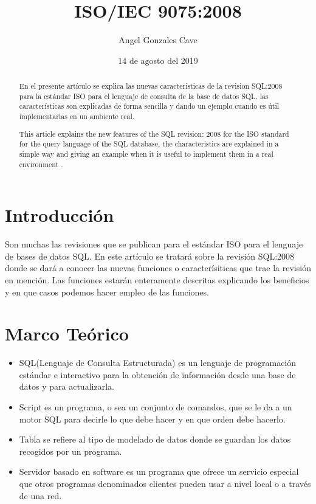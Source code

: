 \documentclass[twoside,twocolumn]{article}
\begin{document}
\title{ISO/IEC 9075:2008}
\author{Angel Gonzales Cave}
\date {14 de agosto del 2019}
\maketitle

\begin{abstract}
En el presente artículo se explica las nuevas caracteristicas de la revision SQL:2008 para la estándar ISO para el lenguaje de consulta de la base de datos SQL, las características son  explicadas de forma sencilla y dando un ejemplo cuando es útil implementarlas en un ambiente real.
\end{abstract}
\begin{abstract}
This article explains the new features of the SQL revision: 2008 for the ISO standard for the query language of the SQL database, the characteristics are explained in a simple way and giving an example when it is useful to implement them in a real environment .
\end{abstract}

\section{Introducción}
Son muchas las revisiones que se publican para el estándar ISO para el lenguaje de bases de datos SQL. En este artículo se tratará sobre la revisión SQL:2008 donde se dará a conocer las nuevas funciones o caracterísiticas que trae la revisión en mención. Las funciones estarán enteramente descritas explicando los beneficios y en que casos podemos hacer empleo de las funciones.
\section{Marco Teórico}
\begin{itemize}
\item SQL(Lenguaje de Consulta Estructurada) es un lenguaje de programación estándar e interactivo para la obtención de información desde una base de datos y para actualizarla.
\item Script es un programa, o sea un conjunto de comandos, que se le da a un motor SQL para decirle lo que debe hacer y en que orden debe hacerlo.
\item Tabla se refiere al tipo de modelado de datos donde se guardan los datos recogidos por un programa.
\item Servidor basado en software es un programa que ofrece un servicio especial que otros programas denominados clientes pueden usar a nivel local o a través de una red.
\end{itemize}
\end{document}

